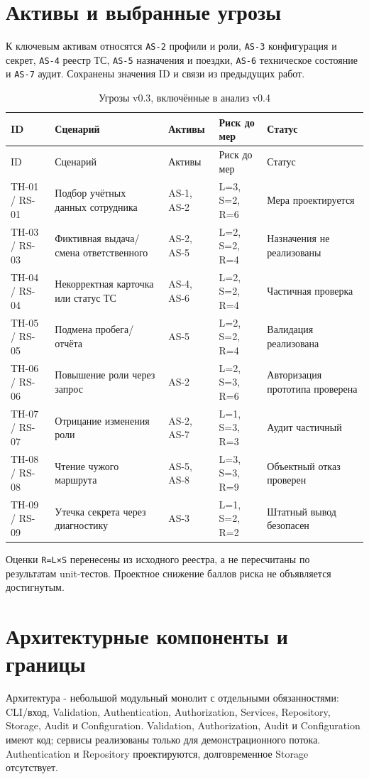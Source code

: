 \documentclass[12pt,a4paper]{article}
\begin{document}
\section{Активы и выбранные угрозы}
К ключевым активам относятся \texttt{AS-2} профили и роли, \texttt{AS-3} конфигурация и секрет, \texttt{AS-4} реестр ТС, \texttt{AS-5} назначения и поездки, \texttt{AS-6} техническое состояние и \texttt{AS-7} аудит. Сохранены значения ID и связи из предыдущих работ.

\begin{longtable}{p{1.7cm}p{4.5cm}p{2cm}p{2.4cm}p{3.5cm}}
\caption{Угрозы v0.3, включённые в анализ v0.4}\\
\toprule ID & Сценарий & Активы & Риск до мер & Статус\\\midrule\endfirsthead
\toprule ID & Сценарий & Активы & Риск до мер & Статус\\\midrule\endhead
TH-01 / RS-01 & Подбор учётных данных сотрудника & AS-1, AS-2 & L=3, S=2, R=6 & Мера проектируется\\
TH-03 / RS-03 & Фиктивная выдача/смена ответственного & AS-2, AS-5 & L=2, S=2, R=4 & Назначения не реализованы\\
TH-04 / RS-04 & Некорректная карточка или статус ТС & AS-4, AS-6 & L=2, S=2, R=4 & Частичная проверка\\
TH-05 / RS-05 & Подмена пробега/отчёта & AS-5 & L=2, S=2, R=4 & Валидация реализована\\
TH-06 / RS-06 & Повышение роли через запрос & AS-2 & L=2, S=3, R=6 & Авторизация прототипа проверена\\
TH-07 / RS-07 & Отрицание изменения роли & AS-2, AS-7 & L=1, S=3, R=3 & Аудит частичный\\
TH-08 / RS-08 & Чтение чужого маршрута & AS-5, AS-8 & L=3, S=3, R=9 & Объектный отказ проверен\\
TH-09 / RS-09 & Утечка секрета через диагностику & AS-3 & L=1, S=2, R=2 & Штатный вывод безопасен\\
\bottomrule
\end{longtable}
Оценки \texttt{R=L×S} перенесены из исходного реестра, а не пересчитаны по результатам unit-тестов. Проектное снижение баллов риска не объявляется достигнутым.

\section{Архитектурные компоненты и границы}
Архитектура - небольшой модульный монолит с отдельными обязанностями: CLI/вход, Validation, Authentication, Authorization, Services, Repository, Storage, Audit и Configuration. Validation, Authorization, Audit и Configuration имеют код; сервисы реализованы только для демонстрационного потока. Authentication и Repository проектируются, долговременное Storage отсутствует.
\end{document}
